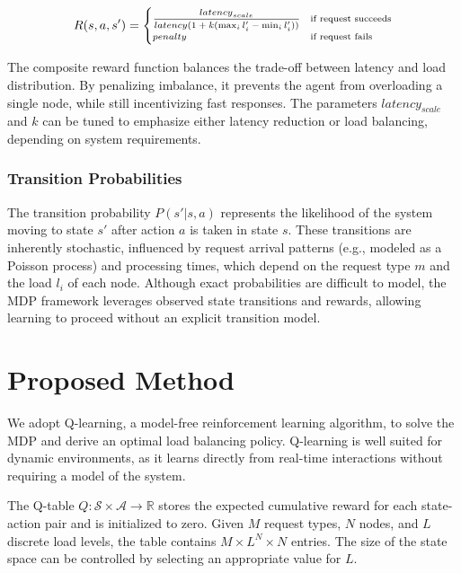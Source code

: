 \documentclass[lnbip]{svmultln}
\begin{document}
\begin{equation}
    \scriptsize
    \label{eq:reward}
    R(s, a, s') =
    \begin{cases}
        \dfrac{{latency}_{{scale}}}{{latency(1 + k(\max_i l_i' - \min_i l_i'))}} & \text{if request succeeds} \\
        {penalty} & \text{if request fails}
    \end{cases}
\end{equation}

The composite reward function balances the trade-off between latency and load distribution. By penalizing imbalance, it prevents the agent from overloading a single node, while still incentivizing fast responses. The parameters ${latency}_{{scale}}$ and $k$ can be tuned to emphasize either latency reduction or load balancing, depending on system requirements.


\subsubsection{Transition Probabilities}\label{s:3.3.4}

The transition probability $P(s' | s, a)$ represents the likelihood of the system moving to state $s'$ after action $a$ is taken in state $s$. These transitions are inherently stochastic, influenced by request arrival patterns (e.g., modeled as a Poisson process) and processing times, which depend on the request type $m$ and the load $l_i$ of each node. Although exact probabilities are difficult to model, the MDP framework leverages observed state transitions and rewards, allowing learning to proceed without an explicit transition model.


\section{Proposed Method}\label{s:4}

We adopt Q-learning, a model-free reinforcement learning algorithm, to solve the MDP and derive an optimal load balancing policy. Q-learning is well suited for dynamic environments, as it learns directly from real-time interactions without requiring a model of the system.

The Q-table $Q: \mathcal{S} \times \mathcal{A} \to \mathbb{R}$ stores the expected cumulative reward for each state-action pair and is initialized to zero. Given $M$ request types, $N$ nodes, and $L$ discrete load levels, the table contains $M \times L^N \times N$ entries. The size of the state space can be controlled by selecting an appropriate value for $L$.
\end{document}
